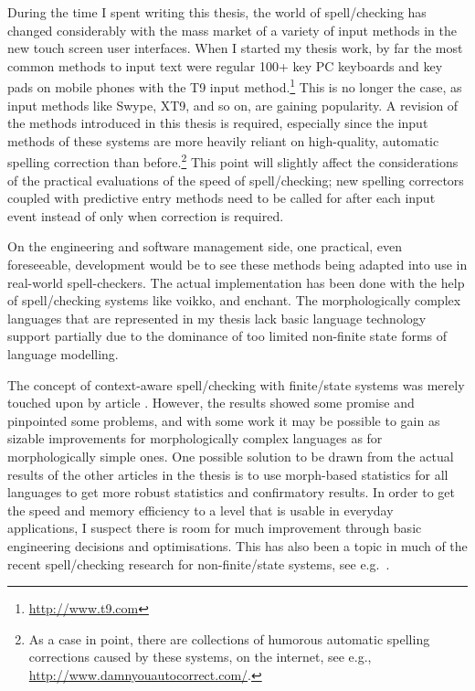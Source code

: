 \documentclass[officiallayout,final]{unihelcompling}
\begin{document}
During the time I spent writing this thesis, the world of spell\-/checking has
changed considerably with the mass market of a variety of input methods in the
new touch screen user interfaces. When I started my thesis work, by far the
most common methods to input text were regular 100+ key PC keyboards and key
pads on mobile phones with the T9 input
method.\footnote{\url{http://www.t9.com}} This is no longer the case, as input
methods like Swype, XT9, and so on, are gaining popularity. A revision of
the methods introduced in this thesis is required, especially since the
input methods of these systems are more heavily reliant on high-quality,
automatic spelling correction than before.\footnote{As a case in point, there
    are collections of humorous automatic spelling corrections caused by these
systems, on the internet, see e.g., \url{http://www.damnyouautocorrect.com/}.}
This point will slightly affect the considerations of the practical evaluations
of the speed of spell\-/checking; new spelling correctors coupled with
predictive entry methods need to be called for after each input event instead
of only when correction is required.

On the engineering and software management side, one practical, even
foreseeable, development would be to see these methods being adapted into use
in real-world spell-checkers. The actual implementation has been done with the
help of spell\-/checking systems like voikko, and enchant. The morphologically
complex languages that are represented in my thesis lack basic language
technology support partially due to the dominance of too limited non-finite
state forms of language modelling.

The concept of context-aware spell\-/checking with finite\-/state systems was
merely touched upon by article . However, the
results showed some promise and pinpointed some problems, and with some work it
may be possible to gain as sizable improvements for morphologically complex
languages as for morphologically simple ones. One possible solution to be drawn
from the actual results of the other articles in the thesis is to use
morph-based statistics for all languages to get more robust statistics
and confirmatory results. In order to get the speed and memory efficiency to a
level that is usable in everyday applications, I suspect there is room for much
improvement through basic engineering decisions and optimisations. This has
also been a topic in much  of the recent spell\-/checking research for
non-finite\-/state systems, see e.g.~\citet{carlson2001scaling}.
\end{document}
